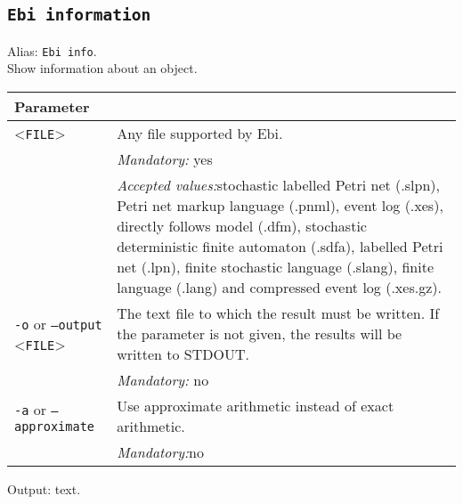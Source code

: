{\subsection{\texttt{Ebi information}}
Alias: \texttt{Ebi info}.\\
Show information about an object.\\
\begin{tabularx}{\linewidth}{lX}
\toprule
Parameter \\\midrule
<\texttt{FILE}>&Any file supported by Ebi.\\
&\textit{Mandatory:} \quad yes\\
&\textit{Accepted values:}\quad stochastic labelled Petri net (.slpn), Petri net markup language (.pnml), event log (.xes), directly follows model (.dfm), stochastic deterministic finite automaton (.sdfa), labelled Petri net (.lpn), finite stochastic language (.slang), finite language (.lang) and compressed event log (.xes.gz).\\
\texttt{-o} or \texttt{--output} <\texttt{FILE}> &
The text file to which the result must be written. If the parameter is not given, the results will be written to STDOUT.\\
&\textit{Mandatory:} \quad no\\
\texttt{-a} or \texttt{--approximate} & Use approximate arithmetic instead of exact arithmetic.\\
&\textit{Mandatory:}\quad no\\
\bottomrule
\end{tabularx}
Output: text.
}
